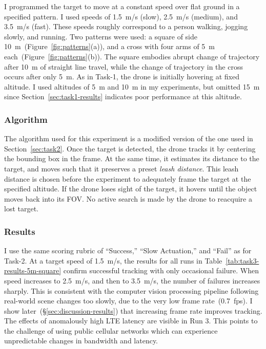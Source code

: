 I programmed the target to move at a constant speed over flat ground
in a specified pattern.  I used speeds of 1.5~m/s (slow), 2.5~m/s
(medium), and 3.5~m/s (fast).  These speeds roughly correspond to a
person walking, jogging slowly, and running.  Two patterns were used:
a square of side 10~m~(Figure~\ref{fig:patterns}(a)), and a cross with
four arms of 5~m each~(Figure~\ref{fig:patterns}(b)).  The square
embodies abrupt change of trajectory after 10~m of straight line travel,
while the change of trajectory in the cross occurs after only 5~m. As in Task-1, the drone is initially hovering at fixed altitude.  I used altitudes of 5~m and 10~m in my experiments, but omitted 15~m
since Section~\ref{sec:task1-results} indicates poor performance at this altitude. 

\subsubsection{Algorithm}
\label{sec:tracking-algorithm-advanced}
The algorithm used for this experiment is a modified version of the one used in Section~\ref{sec:task2}. Once the target is detected, the drone tracks it by centering the bounding box in the frame. At the same time, it estimates its distance to the target, and moves such that it preserves a preset \textit{leash distance}. This leash distance is chosen before the experiment to adequately frame the target at the specified altitude. If the drone loses sight of the target, it hovers until
the object moves back into its FOV. No active search is made
by the drone to reacquire a lost target.

\subsubsection{Results}
\label{sec:task3-results}

I use the same scoring rubric of ``Success,'' ``Slow Actuation,'' and
``Fail'' as for Task-2.  At a target speed of 1.5~m/s, the results for
all runs in Table~\ref{tab:task3-results-5m-square} confirm
successful tracking with only occasional failure.  When speed
increases to 2.5~m/s, and then to 3.5~m/s, the number of failures
increases sharply.  This is consistent with the computer vision
processing pipeline following real-world scene changes too slowly, due
to the very low frame rate~(0.7~fps).  I show
later~(\S\ref{sec:discussion-results}) that increasing frame rate
improves tracking.  The effects of anomalously high LTE latency are
visible in Run 3.  This points to the challenge of using public
cellular networks which can experience unpredictable changes in bandwidth and latency.

